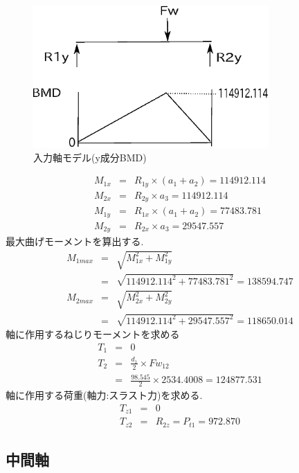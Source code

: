 \begin{figure}[htbp]
\begin{center}
\includegraphics[width=9cm]{../picture/jiku132.eps}
\end{center}
\caption{入力軸モデル(y成分BMD)}
\end{figure}
\begin{eqnarray}
M_{1x} &=& R_{1y} \times (a_1+a_2)=114912.114\\
M_{2x} &=& R_{2y} \times a_3=114912.114\\
M_{1y} &=& R_{1x} \times (a_1+a_2)=77483.781\\
M_{2y} &=& R_{2x} \times a_3=29547.557
\end{eqnarray}
最大曲げモーメントを算出する.
\begin{eqnarray}
M_{1max} &=& \sqrt {M_{1x}^2+M_{1y}^2}\\
         &=& \sqrt {114912.114^2+77483.781^2}=138594.747\\
M_{2max} &=& \sqrt {M_{2x}^2+M_{2y}^2}\\
         &=& \sqrt {114912.114^2+29547.557^2}=118650.014
\end{eqnarray}
軸に作用するねじりモーメントを求める
\begin{eqnarray}
T_{1} &=& 0\\
T_{2} &=& \frac{d_1}{2} \times Fw_{12}\\
      &=& \frac{98.545}{2} \times 2534.4008 = 124877.531
\end{eqnarray}
軸に作用する荷重(軸力:スラスト力)を求める.
\begin{eqnarray}
T_{z1} &=& 0\\
T_{z2} &=& R_{2z} = P_{t1} = 972.870
\end{eqnarray}




\subsection{中間軸}
